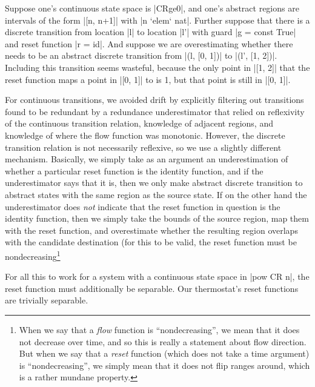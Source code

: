 \documentclass[runningheads]{llncs}
\begin{document}
Suppose one's continuous state space is |CRge0|, and one's abstract regions are intervals of the form |[n, n+1]| with |n `elem` nat|. Further suppose that there is a discrete transition from location |l| to location |l'| with guard |g = const True| and reset function |r = id|. And suppose we are overestimating whether there needs to be an abstract discrete transition from |(l, [0, 1])| to |(l', [1, 2])|. Including this transition seems wasteful, because the only point in |[1, 2]| that the reset function maps a point in |[0, 1]| to is 1, but that point is still in |[0, 1]|.

For continuous transitions, we avoided drift by explicitly filtering out transitions found to be redundant by a redundance underestimator that relied on reflexivity of the continuous transition relation, knowledge of adjacent regions, and knowledge of where the flow function was monotonic. However, the discrete transition relation is not necessarily reflexive, so we use a slightly different mechanism. Basically, we simply take as an argument an underestimation of whether a particular reset function is the identity function, and if the underestimator says that it is, then we only make abstract discrete transition to abstract states with the same region as the source state. If on the other hand the underestimator does \emph{not} indicate that the reset function in question is the identity function, then we simply take the bounds of the source region, map them with the reset function, and overestimate whether the resulting region overlaps with the candidate destination (for this to be valid, the reset function must be nondecreasing\footnote{When we say that a \emph{flow} function is ``nondecreasing'', we mean that it does not decrease over time, and so this is really a statement about flow direction. But when we say that a \emph{reset} function (which does not take a time argument) is ``nondecreasing'', we simply mean that it does not flip ranges around, which is a rather mundane property.}


For all this to work for a system with a continuous state space in |pow CR n|, the reset function must additionally be separable. Our thermostat's reset functions are trivially separable.
\end{document}
